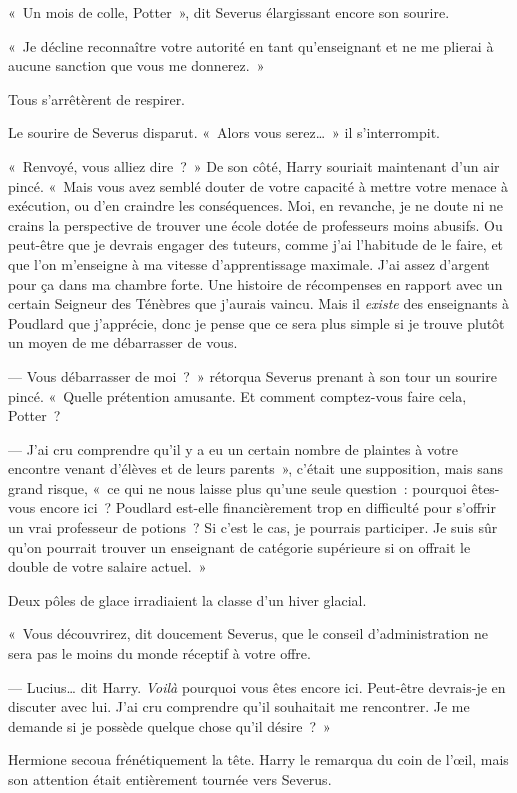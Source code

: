 «~Un mois de colle, Potter~», dit Severus élargissant encore son sourire.

«~Je décline reconnaître votre autorité en tant qu'enseignant et ne me plierai à aucune sanction que vous me donnerez.~»

Tous s'arrêtèrent de respirer.

Le sourire de Severus disparut.
«~Alors vous serez…~»
il s'interrompit.

«~Renvoyé, vous alliez dire~?~»
De son côté, Harry souriait maintenant d'un air pincé.
«~Mais vous avez semblé douter de votre capacité à mettre votre menace à exécution, ou d'en craindre les conséquences.
Moi, en revanche, je ne doute ni ne crains la perspective de trouver une école dotée de professeurs moins abusifs.
Ou peut-être que je devrais engager des tuteurs, comme j'ai l'habitude de le faire, et que l'on m'enseigne à ma vitesse d'apprentissage maximale.
J'ai assez d'argent pour ça dans ma chambre forte.
Une histoire de récompenses en rapport avec un certain Seigneur des Ténèbres que j'aurais vaincu.
Mais il \emph{existe} des enseignants à Poudlard que j'apprécie, donc je pense que ce sera plus simple si je trouve plutôt un moyen de me débarrasser de vous.

--- Vous débarrasser de moi~?~» rétorqua Severus prenant à son tour un sourire pincé.
«~Quelle prétention amusante.
Et comment comptez-vous faire cela, Potter~?

--- J'ai cru comprendre qu'il y a eu un certain nombre de plaintes à votre encontre venant d'élèves et de leurs parents~», c'était une supposition, mais sans grand risque, «~ce qui ne nous laisse plus qu'une seule question~: pourquoi êtes-vous encore ici~?
Poudlard est-elle financièrement trop en difficulté pour s'offrir un vrai professeur de potions~?
Si c'est le cas, je pourrais participer.
Je suis sûr qu'on pourrait trouver un enseignant de catégorie supérieure si on offrait le double de votre salaire actuel.~»

Deux pôles de glace irradiaient la classe d'un hiver glacial.

«~Vous découvrirez, dit doucement Severus, que le conseil d'administration ne sera pas le moins du monde réceptif à votre offre.

--- Lucius… dit Harry.
\emph{Voilà} pourquoi vous êtes encore ici.
Peut-être devrais-je en discuter avec lui.
J'ai cru comprendre qu'il souhaitait me rencontrer.
Je me demande si je possède quelque chose qu'il désire~?~»

Hermione secoua frénétiquement la tête.
Harry le remarqua du coin de l'œil, mais son attention était entièrement tournée vers Severus.

